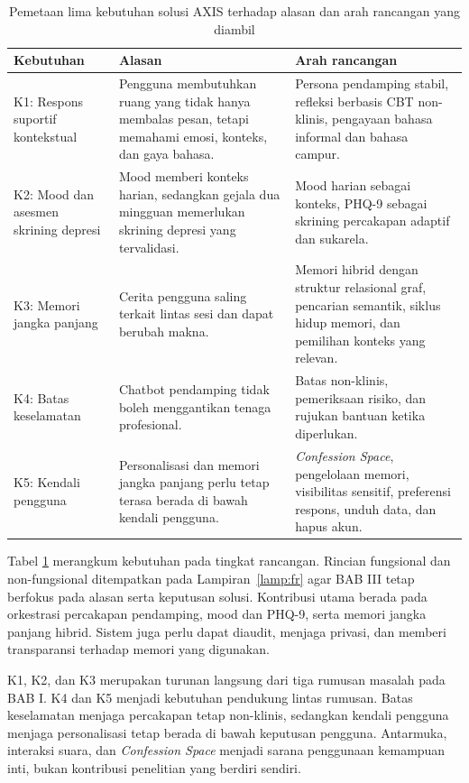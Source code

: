 \begin{table}[!htbp]
\centering
\caption{Pemetaan lima kebutuhan solusi AXIS terhadap alasan dan arah rancangan yang diambil}
\label{tab:kebutuhan-solusi}
{\footnotesize
\begin{tabularx}{\textwidth}{|>{\raggedright\arraybackslash}p{3.2cm}|>{\raggedright\arraybackslash}X|>{\raggedright\arraybackslash}X|}
\hline
\rowcolor{tableheadgray}
\textbf{Kebutuhan} & \textbf{Alasan} & \textbf{Arah rancangan} \\
\hline
K1: Respons suportif kontekstual & Pengguna membutuhkan ruang yang tidak hanya membalas pesan, tetapi memahami emosi, konteks, dan gaya bahasa. & Persona pendamping stabil, refleksi berbasis CBT non-klinis, pengayaan bahasa informal dan bahasa campur. \\
\hline
K2: Mood dan asesmen skrining depresi & Mood memberi konteks harian, sedangkan gejala dua mingguan memerlukan skrining depresi yang tervalidasi. & Mood harian sebagai konteks, PHQ-9 sebagai skrining percakapan adaptif dan sukarela. \\
\hline
K3: Memori jangka panjang & Cerita pengguna saling terkait lintas sesi dan dapat berubah makna. & Memori hibrid dengan struktur relasional graf, pencarian semantik, siklus hidup memori, dan pemilihan konteks yang relevan. \\
\hline
K4: Batas keselamatan & Chatbot pendamping tidak boleh menggantikan tenaga profesional. & Batas non-klinis, pemeriksaan risiko, dan rujukan bantuan ketika diperlukan. \\
\hline
K5: Kendali pengguna & Personalisasi dan memori jangka panjang perlu tetap terasa berada di bawah kendali pengguna. & \textit{Confession Space}, pengelolaan memori, visibilitas sensitif, preferensi respons, unduh data, dan hapus akun. \\
\hline
\end{tabularx}
}
\end{table}

Tabel \ref{tab:kebutuhan-solusi} merangkum kebutuhan pada tingkat rancangan. Rincian fungsional dan non-fungsional ditempatkan pada Lampiran~\ref{lamp:fr} agar BAB III tetap berfokus pada alasan serta keputusan solusi. Kontribusi utama berada pada orkestrasi percakapan pendamping, mood dan PHQ-9, serta memori jangka panjang hibrid. Sistem juga perlu dapat diaudit, menjaga privasi, dan memberi transparansi terhadap memori yang digunakan.

K1, K2, dan K3 merupakan turunan langsung dari tiga rumusan masalah pada BAB I. K4 dan K5 menjadi kebutuhan pendukung lintas rumusan. Batas keselamatan menjaga percakapan tetap non-klinis, sedangkan kendali pengguna menjaga personalisasi tetap berada di bawah keputusan pengguna. Antarmuka, interaksi suara, dan \textit{Confession Space} menjadi sarana penggunaan kemampuan inti, bukan kontribusi penelitian yang berdiri sendiri.

